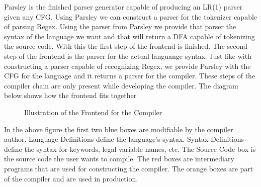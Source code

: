 Parsley is the finished parser generator capable of producing an LR(1) parser given any CFG. Using Parsley we can construct a parser for the tokenizer capable of parsing Regex. Using the parser from Parsley we provide that parser the syntax of the language we want and that will return a DFA capable of tokenizing the source code. With this the first step of the frontend is finished. The second step of the frontend is the parser for the actual languange syntax. Just like with constructing a parser capable of recognizing Regex, we provide Parsley with the CFG for the language and it returns a parser for the compiler. These steps of the compiler chain are only present while  developing the compiler. The diagram below shows how the frontend fits together
\begin{figure}[H]
\caption{Illustration of the Frontend for the Compiler}
\end{figure}

In the above figure the first two blue boxes are modifiable by the compiler author. Language Definitions define the language's syntax. Syntax Definitions define the syntax for keywords, legal variable names, etc. The Source Code box is the source code the user wants to compile. The red boxes are intermediary programs that are used for constructing the compiler. The orange boxes are part of the compiler and are used in production.
